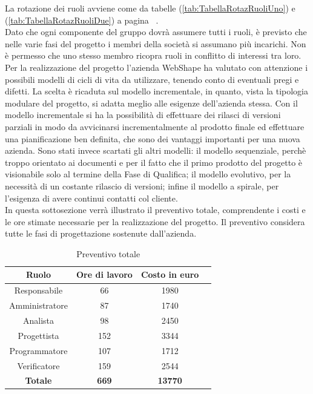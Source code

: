 La rotazione dei ruoli avviene come da tabelle (\ref{tab:TabellaRotazRuoliUno}) e (\ref{tab:TabellaRotazRuoliDue}) a pagina ~\pageref{tab:TabellaRotazRuoliUno}.\\
Dato che ogni componente del gruppo dovr\`a assumere tutti i ruoli, \`e previsto che nelle varie fasi del progetto i membri della societ\`a si assumano pi\`u incarichi. Non \`e permesso che uno stesso membro ricopra ruoli in conflitto di interessi tra loro.\\

Per la realizzazione del progetto l'azienda WebShape ha valutato con attenzione i possibili modelli di cicli di vita da utilizzare, tenendo conto di eventuali pregi e difetti. 
La scelta \`e ricaduta sul modello incrementale, in quanto, vista la tipologia modulare del progetto, si adatta meglio alle esigenze dell'azienda stessa. Con il modello incrementale si ha la possibilit\`a di effettuare dei rilasci di versioni parziali in modo da avvicinarsi incrementalmente al prodotto finale ed effettuare una pianificazione ben definita, che sono dei vantaggi importanti per una nuova azienda. Sono stati invece scartati gli altri modelli: il modello sequenziale, perch\`e troppo orientato ai documenti e per il fatto che il primo prodotto del progetto \`e visionabile solo al termine della Fase di Qualifica; il modello evolutivo, per la necessit\`a di un costante rilascio di versioni; infine il modello a spirale, per l'esigenza di avere continui contatti col cliente.\\
In questa sottosezione verr\` a illustrato il preventivo totale, comprendente i costi e le ore stimate necessarie per la realizzazione del progetto. Il preventivo considera tutte le fasi di progettazione sostenute dall'azienda.

\begin{table}[h]
	\begin{center}
		  \begin{tabular}{|c|c|c|c|}
		 \hline 
		 \textbf{Ruolo} & \textbf{Ore di lavoro} & \textbf{Costo in euro}\\
		 \hline
		Responsabile & 66 & 1980 \\
		Amministratore & 87 & 1740\\
		Analista & 98 & 2450\\
		Progettista & 152 & 3344\\
		Programmatore & 107 & 1712 \\
		Verificatore & 159 & 2544\\
        \hline
        \textbf{Totale} & \textbf{669} & \textbf{13770}\\
		\hline
		\end{tabular}
	\caption{Preventivo totale} 
	\label{tab:tabella_preventivo}
	\end{center}	
\end{table}

